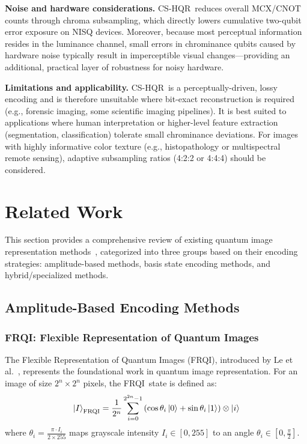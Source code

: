 \documentclass{ipol}
\newcommand{\cshqr}{\textsc{CS-HQR}}
\newcommand{\frqi}{\textsc{FRQI}}
\begin{document}
\textbf{Noise and hardware considerations.}
\cshqr\ reduces overall MCX/CNOT counts through chroma subsampling, which
directly lowers cumulative two-qubit error exposure on NISQ devices.
Moreover, because most perceptual information resides in the luminance
channel, small errors in chrominance qubits caused by hardware noise
typically result in imperceptible visual changes---providing an additional,
practical layer of robustness for noisy hardware.

\textbf{Limitations and applicability.}
\cshqr\ is a perceptually-driven, lossy encoding and is therefore unsuitable
where bit-exact reconstruction is required (e.g., forensic imaging, some
scientific imaging pipelines). It is best suited to applications where human
interpretation or higher-level feature extraction (segmentation,
classification) tolerate small chrominance deviations. For images with highly
informative color texture (e.g., histopathology or multispectral remote
sensing), adaptive subsampling ratios (4:2:2 or 4:4:4) should be considered.

\FloatBarrier
\section{Related Work}
\label{sec:related_work}

This section provides a comprehensive review of existing quantum image
representation methods~\cite{ref45,ref52,ref70}, categorized into three groups based on their encoding
strategies: amplitude-based methods, basis state encoding methods, and
hybrid/specialized methods.

\FloatBarrier
\subsection{Amplitude-Based Encoding Methods}

\FloatBarrier
\subsubsection{\frqi: Flexible Representation of Quantum Images}

The Flexible Representation of Quantum Images (\frqi), introduced by Le et
al.~\cite{ref3}, represents the foundational work in quantum image
representation. For an image of size $2^n \times 2^n$ pixels, the \frqi\
state is defined as:
\begin{equation}
\ket{I}_{\text{FRQI}} = \frac{1}{2^n} \sum_{i=0}^{2^{2n}-1}
  \left(\cos\theta_i\ket{0} + \sin\theta_i\ket{1}\right) \otimes \ket{i}
\label{eq:frqi_state}
\end{equation}
where $\theta_i = \frac{\pi \cdot I_i}{2 \times 255}$ maps grayscale
intensity $I_i \in [0, 255]$ to an angle $\theta_i \in [0, \frac{\pi}{2}]$.
\end{document}
